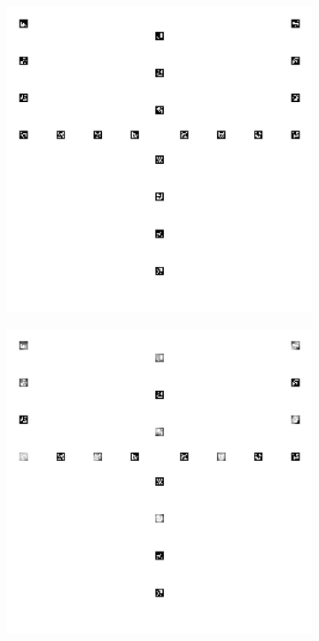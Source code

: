 \documentclass[../Head/report.tex]{subfiles}
\begin{document}
\begin{figure}[H]
\begin{subfigure}[t]{.20\textwidth}
        \caption{}
        \label{fig:vision_navigation_one_pattern_board}
    \end{subfigure}
     \hspace{0.2em}
    \begin{subfigure}[t]{.20\textwidth}
        \centering
        \includegraphics[width=\textwidth]{../Figures/vision_navigation/grid_board_new_200_big_onepattern_missing_markers1.png}
        \caption{}
        \label{fig:vision_navigation_one_pattern_board_missing_markers}
    \end{subfigure}
         \hspace{0.2em}
    \begin{subfigure}[t]{.20\textwidth}
        \centering
        \includegraphics[width=\textwidth]{../Figures/vision_navigation/grid_board_new_200_big_onepattern_missing_markers_wear.png}

\end{subfigure}
\end{figure}
\end{document}
